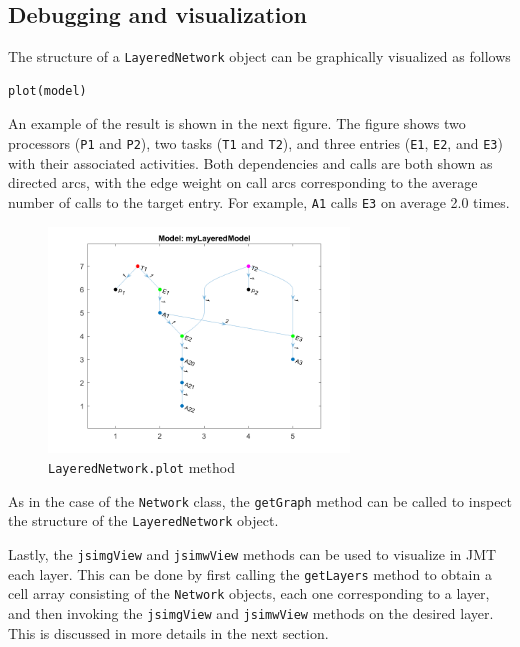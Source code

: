 
\subsection{Debugging and visualization}
The structure of a \texttt{LayeredNetwork} object can be graphically visualized as follows
\begin{lstlisting}
plot(model)
\end{lstlisting}
An example of the result is shown in the next figure. The figure shows two processors (\texttt{P1} and \texttt{P2}), two tasks (\texttt{T1} and \texttt{T2}), and three entries (\texttt{E1}, \texttt{E2}, and \texttt{E3}) with their associated activities. Both dependencies and calls are both shown as directed arcs, with the edge weight on call arcs corresponding to the average number of calls to the target entry. For example, \texttt{A1} calls \texttt{E3} on average 2.0 times.
\begin{figure}
  \centering
  \includegraphics[width=8cm]{./images/lqnView.png}
  \caption{\texttt{LayeredNetwork.plot} method}\label{FIG_lqnView}
\end{figure}
As in the case of the \texttt{Network} class, the \texttt{getGraph} method can be called to inspect the structure of the \texttt{LayeredNetwork} object.

Lastly, the \texttt{jsimgView} and \texttt{jsimwView} methods can be used to visualize in JMT each layer. This can be done by first calling the \texttt{getLayers} method to obtain a cell array consisting of the \texttt{Network} objects, each one corresponding to a layer, and then invoking the \texttt{jsimgView} and \texttt{jsimwView} methods on the desired layer. This is discussed in more details in the next section.

